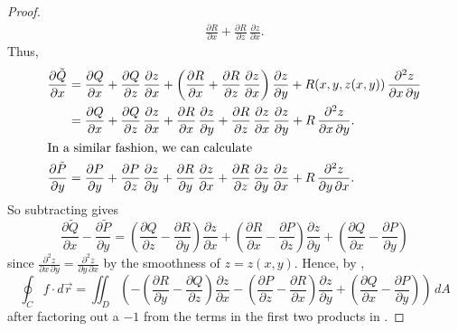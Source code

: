 \begin{proof}
\begin{align*}
   \frac{\partial R}{\partial x} + \frac{\partial R}{\partial z}\,\frac{\partial z}{\partial x} .
\end{align*}
 Thus,
 \begin{align*}
  \frac{\partial \tilde{Q}}{\partial x} &= \frac{\partial Q}{\partial x} + \frac{\partial Q}{\partial z}\,
   \frac{\partial z}{\partial x} + \left( \frac{\partial R}{\partial x} + \frac{\partial R}{\partial z}\,
   \frac{\partial z}{\partial x} \right) \frac{\partial z}{\partial y} + R(x,y,z(x,y))\,
   \frac{\partial^2 z}{\partial x \, \partial y}\\
   &= \frac{\partial Q}{\partial x} + \frac{\partial Q}{\partial z}\,\frac{\partial z}{\partial x} +
    \frac{\partial R}{\partial x}\,\frac{\partial z}{\partial y} + \frac{\partial R}{\partial z}\,
    \frac{\partial z}{\partial x}\,\frac{\partial z}{\partial y} + R\,\frac{\partial^2 z}{\partial x \, \partial y}.\\
  \intertext{In a similar fashion, we can calculate}
  \frac{\partial \tilde{P}}{\partial y} &= \frac{\partial P}{\partial y} +
   \frac{\partial P}{\partial z}\,\frac{\partial z}{\partial y} +
    \frac{\partial R}{\partial y}\,\frac{\partial z}{\partial x} + \frac{\partial R}{\partial z}\,
    \frac{\partial z}{\partial y}\,\frac{\partial z}{\partial x} + R\,\frac{\partial^2 z}{\partial y \, \partial x}.
 \end{align*}
 So subtracting gives
 \begin{equation}\label{eqn:stokeslong}
  \frac{\partial \tilde{Q}}{\partial x} - \frac{\partial \tilde{P}}{\partial y} =
   \left( \frac{\partial Q}{\partial z} - \frac{\partial R}{\partial y} \right) \frac{\partial z}{\partial x}
   + \left( \frac{\partial R}{\partial x} - \frac{\partial P}{\partial z}\right) \frac{\partial z}{\partial y}
   + \left( \frac{\partial Q}{\partial x} - \frac{\partial P}{\partial y} \right)
 \end{equation}
 since $\frac{\partial^2 z}{\partial x \, \partial y} = \frac{\partial^2 z}{\partial y \, \partial x}$ by the
 smoothness of $z=z(x,y)$. Hence, by ,
 \begin{equation}\label{eqn:stokespart1}
  \oint_{C}{f}\cdot d\vec{r} = \iint_{D} \left(
   -\left( \frac{\partial R}{\partial y} - \frac{\partial Q}{\partial z} \right) \frac{\partial z}{\partial x}
   -\left( \frac{\partial P}{\partial z} - \frac{\partial R}{\partial x} \right) \frac{\partial z}{\partial y}
   + \left( \frac{\partial Q}{\partial x} - \frac{\partial P}{\partial y} \right) \right)\,dA
 \end{equation}
 after factoring out a $-1$ from the terms in the first two products in .
 

\end{proof}
